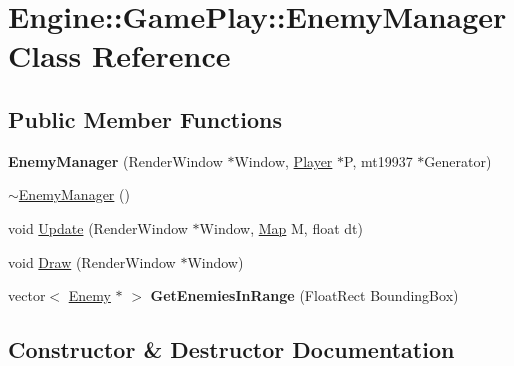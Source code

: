 \hypertarget{class_engine_1_1_game_play_1_1_enemy_manager}{}\section{Engine\+:\+:Game\+Play\+:\+:Enemy\+Manager Class Reference}
\label{class_engine_1_1_game_play_1_1_enemy_manager}
\subsection*{Public Member Functions}
\begin{DoxyCompactItemize}
\item 
\mbox{\label{class_engine_1_1_game_play_1_1_enemy_manager_af20b8cb960acd6a5aabfe6ee5bb9e9e2}} 
{\bfseries Enemy\+Manager} (Render\+Window $\ast$Window, \hyperlink{class_engine_1_1_game_play_1_1_player}{Player} $\ast$P, mt19937 $\ast$Generator)
\item 
\hyperlink{class_engine_1_1_game_play_1_1_enemy_manager_a503eadcd690205ae495d3761bdfdfcb6}{$\sim$\+Enemy\+Manager} ()
\item 
void \hyperlink{class_engine_1_1_game_play_1_1_enemy_manager_a545df3d86d86905d5db1e4bb8f327137}{Update} (Render\+Window $\ast$Window, \hyperlink{class_engine_1_1_core_1_1_map}{Map} M, float dt)
\item 
void \hyperlink{class_engine_1_1_game_play_1_1_enemy_manager_a8feb401224cac44bec8b2d2c00b0910c}{Draw} (Render\+Window $\ast$Window)
\item 
\mbox{\label{class_engine_1_1_game_play_1_1_enemy_manager_afc7a1062c7cf55177a8dd99f8547ec47}} 
vector$<$ \hyperlink{class_engine_1_1_game_play_1_1_enemy}{Enemy} $\ast$ $>$ {\bfseries Get\+Enemies\+In\+Range} (Float\+Rect Bounding\+Box)
\end{DoxyCompactItemize}


\subsection{Constructor \& Destructor Documentation}
\mbox{\label{class_engine_1_1_game_play_1_1_enemy_manager_a503eadcd690205ae495d3761bdfdfcb6}} 

